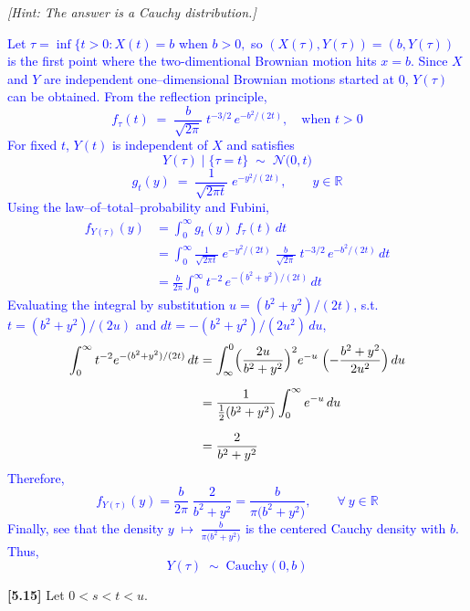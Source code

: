 \documentclass{article}
\begin{document}
\textit{[Hint: The answer is a Cauchy distribution.]}

\textcolor{blue}{
Let  
$
\tau=\inf\{t>0:X(t)=b$ when $b>0,
$  
so $(X(\tau),Y(\tau))=(b,Y(\tau))$ is the first point where the two-dimentional Brownian motion hits $x=b$.  
Since $X$ and $Y$ are independent one–dimensional Brownian motions started at $0$, $Y(\tau)$ can be obtained.
From the reflection principle,  
$$
f_\tau(t)\;=\;\frac{b}{\sqrt{2\pi}}\;t^{-3/2}\,e^{-b^{2}/(2t)},\quad \text{when } t>0
$$  
For fixed $t$, $Y(t)$ is independent of $X$ and satisfies  
$$
Y(\tau)\mid\{\tau=t\}\;\sim\;\mathcal N\!\bigl(0,t\bigr)
$$
$$
g_t(y)\;=\;\frac{1}{\sqrt{2\pi t}}\;e^{-y^{2}/(2t)},\qquad y\in\mathbb R
$$  
Using the law–of–total–probability and Fubini,
$$
\begin{aligned}
f_{Y(\tau)}(y)
&=\int_{0}^{\infty}g_t(y)\,f_\tau(t)\,dt\\[6pt]
&=\int_{0}^{\infty}
      \frac{1}{\sqrt{2\pi t}}\;e^{-y^{2}/(2t)}
      \;\frac{b}{\sqrt{2\pi}}\;t^{-3/2}\,e^{-b^{2}/(2t)}\,dt\\[6pt]
&=\frac{b}{2\pi}\int_{0}^{\infty}t^{-2}\,
e^{-(b^{2}+y^{2})/(2t)}\,dt
\end{aligned}
$$
Evaluating the integral by substitution $u=(b^{2}+y^{2})/(2t)$, s.t.
$t=(b^{2}+y^{2})/(2u)$ and $dt=-(b^{2}+y^{2})/(2u^{2})\,du$,
$$
\begin{aligned}
\int_{0}^{\infty}t^{-2}e^{-(b^{2}+y^{2})/(2t)}\,dt
&=\int_{\infty}^{0}\Bigl(\frac{2u}{b^{2}+y^{2}}\Bigr)^{2}
      e^{-u}\;\Bigl(-\frac{b^{2}+y^{2}}{2u^{2}}\Bigr)\,du\\[6pt]
&=\frac{1}{\tfrac{1}{2}(b^{2}+y^{2})}\int_{0}^{\infty}e^{-u}\,du\\[6pt]
&=\frac{2}{b^{2}+y^{2}}
\end{aligned}
$$
Therefore,
$$
f_{Y(\tau)}(y)=\frac{b}{2\pi}\;\frac{2}{b^{2}+y^{2}}
              =\frac{b}{\pi\bigl(b^{2}+y^{2}\bigr)},\qquad \forall \ y\in\mathbb R
$$  
Finally, see that the density
$
y\;\longmapsto\;\frac{b}{\pi\bigl(b^{2}+y^{2}\bigr)}
$
is the centered Cauchy density with $b$. Thus,
$$
Y(\tau)\;\sim\;\text{Cauchy}(0,b)
$$
}


\textbf{[5.15]} Let $0 < s < t < u$.
\end{document}
